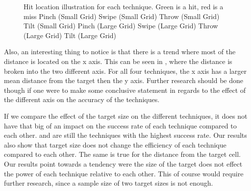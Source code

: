 \begin{figure}[H]
	\caption{
		Hit location illustration for each technique. Green is a hit, red is a miss
		\protect{} Pinch (Small Grid)
		\protect{} Swipe (Small Grid)
		\protect{} Throw (Small Grid)
		\protect{} Tilt (Small Grid)
		\protect{} Pinch (Large Grid)
		\protect{} Swipe (Large Grid)
		\protect{} Throw (Large Grid)
		\protect{} Tilt (Large Grid)
	}
	\label{fig:thitboxes}
\end{figure}


Also, an interesting thing to notice is that there is a trend where most of the distance is located on the x axis. 
This can be seen in , where the distance is broken into the two different axis. 
For all four techniques, the x axis has a larger mean distance from the target then the y axis. 
Further research should be done though if one were to make some conclusive statement in regards to the effect of the different axis on the accuracy of the techniques. 

If we compare the effect of the target size on the different techniques, it does not have that big of an impact on the success rate of each technique compared to each other. 
\swipe and \throw are still the techniques with the highest success rate.
Our results also show that target size does not change the efficiency of each technique compared to each other.
The same is true for the distance from the target cell. 
Our results point towards a tendency were the size of the target does not effect the power of each technique relative to each other.
This of course would require further research, since a sample size of two target sizes is not enough. 

